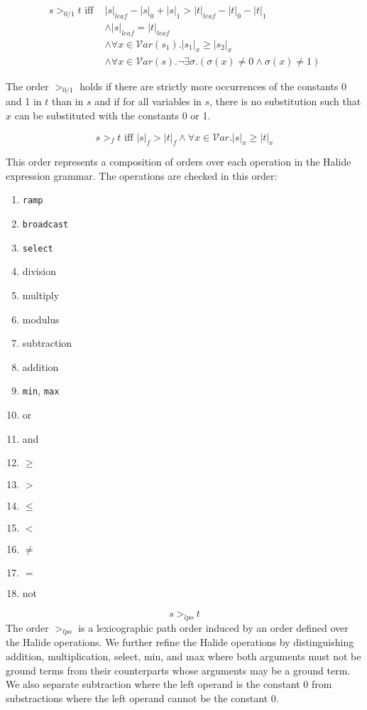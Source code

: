 \documentclass[acmsmall,review,anonymous]{acmart}\settopmatter{printfolios=true,printccs=false,printacmref=false}
\begin{document}
\begin{equation}
\begin{split}
s >_{0/1} t \textrm{ iff } & |s|_{leaf} - |s|_0 + |s|_1 > |t|_{leaf} - |t|_0 - |t|_1 \\
&  \wedge |s|_{leaf} = |t|_{leaf} \\
& \wedge \forall x \in \mathcal{V}ar(s_1) . |s_1|_x \geq |s_2|_x \\ 
& \wedge \forall x \in \mathcal{V}ar(s) . \lnot \exists \sigma . (\sigma(x) \neq 0 \wedge \sigma(x) \neq 1)
\end{split}
\end{equation}

The order $>_{0/1}$ holds if there are strictly more occurrences of the constants 0 and 1 in $t$ than in $s$ and if for all variables in $s$, there is no substitution such that $x$ can be substituted with the constants 0 or 1.

\begin{equation}
s >_{f} t \textrm{ iff } |s|_{f} > |t|_{f} \wedge \forall x \in \mathcal{V}ar . |s|_x \geq |t|_x
\end{equation} 

This order represents a composition of orders over each operation in the Halide expression grammar. The operations are checked in this order:

\begin{enumerate}
  \item \texttt{ramp}
  \item \texttt{broadcast}
  \item \texttt{select}
  \item division
  \item multiply
  \item modulus
  \item subtraction
  \item addition
  \item \texttt{min}, \texttt{max}
  \item or
  \item and
  \item $\geq$
  \item $>$
  \item $\leq$
  \item $<$
  \item $\neq$
  \item $=$
  \item not
\end{enumerate}

\begin{equation}
s >_{lpo} t
\end{equation}
The order $>_{lpo}$ is a lexicographic path order induced by an order defined over the Halide operations. We further refine the Halide operations by distinguishing addition, multiplication, select, min, and max where both arguments must not be ground terms from their counterparts whose arguments may be a ground term. We also separate subtraction where the left operand is the constant 0 from substractions where the left operand cannot be the constant 0.
\end{document}

